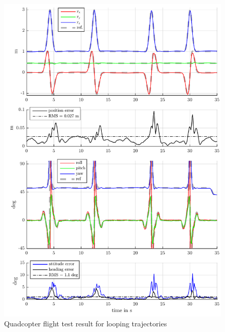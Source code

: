 \begin{figure}
 \centering
 \includegraphics{graphics/QuadFlightTest/QuadLoopResult}
 \caption{Quadcopter flight test result for looping trajectories}
 \label{fig:QuadLoopResult}
\end{figure}

